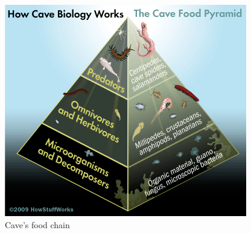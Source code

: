 \documentclass[draft, final]{report}
\begin{document}
\begin{figure}[!ht]
  \centering
  \includegraphics[scale=1]{LateX/Images/Foodchain.png}
  \caption{Cave's food chain \cite{foodchainpyramid}}
\end{figure}
\clearpage
\end{document}
